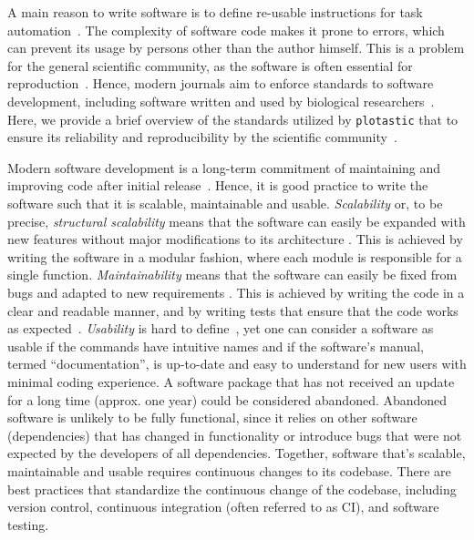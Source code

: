 \label{sec:intro_code_quality}
A main reason to write software is to define re-usable instructions for task
automation~\cite{narztReusabilityConceptProcess1998}.
The complexity of software code makes it prone to errors, which can prevent
its usage by persons other than the author himself. This is a problem for the
general scientific community, as the software is often essential for
reproduction~\cite{sandveTenSimpleRules2013}. Hence, modern journals aim to
enforce standards to software development, including software written and used
by biological researchers~\cite{smithJournalOpenSource2018}. Here, we provide a
brief overview of the standards utilized by \texttt{plotastic} that to ensure
its reliability and reproducibility by the scientific
community~\cite{pengReproducibleResearchComputational2011}.


Modern software development is a long-term commitment of maintaining and
improving code after initial release~\cite{boswellArtReadableCode2011}. Hence,
it is good practice to write the software such that it is scalable, maintainable
and usable. \emph{Scalability} or, to be precise, \emph{structural scalability} means that the
software can easily be expanded with new features without major modifications to
its architecture \cite{bondiCharacteristicsScalabilityTheir2000}. This is
achieved by writing the software in a modular fashion, where each module is
responsible for a single function. \emph{Maintainability} means that the software can
easily be fixed from bugs and adapted to new requirements
\cite{kazmanMaintainability2020}. This is achieved by writing the code in a
clear and readable manner, and by writing tests that ensure that the code works
as expected~\cite{boswellArtReadableCode2011}. \emph{Usability} is hard to
define~\cite{brookeSUSQuickDirty1996}, yet one can consider a software as usable
if the commands have intuitive names and if the software's manual, termed
``documentation'', is up-to-date and easy to understand for new users with
minimal coding experience. A software package that has not received an update
for a long time (approx. one year) could be considered abandoned. Abandoned
software is unlikely to be fully functional, since it relies on other software
(dependencies) that has changed in functionality or introduce bugs that were not
expected by the developers of all dependencies. Together, software that's
scalable, maintainable and usable requires continuous changes to its codebase.
There are best practices that standardize the continuous change of the codebase,
including version control, continuous integration (often referred to as CI), and
software testing.

